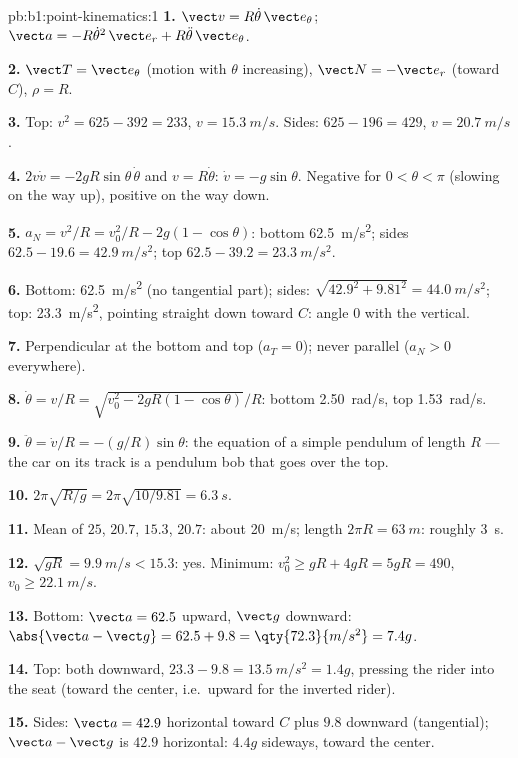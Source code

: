 \begin{solution}{pb:b1:point-kinematics:1}
\textbf{1.} $\vect v = R\dot\theta\,\vect e_\theta$; $\vect a = -R\dot\theta^2
\,\vect e_r + R\ddot\theta\,\vect e_\theta$.

\textbf{2.} $\vect T = \vect e_\theta$ (motion with $\theta$ increasing),
$\vect N = -\vect e_r$ (toward $C$), $\rho = R$.

\textbf{3.} Top: $v^2 = 625 - 392 = 233$, $v = \qty{15.3}{m/s}$. Sides:
$625 - 196 = 429$, $v = \qty{20.7}{m/s}$.

\textbf{4.} $2v\dot v = -2gR\sin\theta\,\dot\theta$ and $v = R\dot\theta$:
$\dot v = -g\sin\theta$. Negative for $0 < \theta < \pi$ (slowing on the
way up), positive on the way down.

\textbf{5.} $a_N = v^2/R = v_0^2/R - 2g(1 - \cos\theta)$: bottom
\qty{62.5}{m/s^2}; sides $62.5 - 19.6 = \qty{42.9}{m/s^2}$; top $62.5 -
39.2 = \qty{23.3}{m/s^2}$.

\textbf{6.} Bottom: \qty{62.5}{m/s^2} (no tangential part); sides:
$\sqrt{42.9^2 + 9.81^2} = \qty{44.0}{m/s^2}$; top: \qty{23.3}{m/s^2},
pointing straight down toward $C$: angle $0$ with the vertical.

\textbf{7.} Perpendicular at the bottom and top ($a_T = 0$); never
parallel ($a_N > 0$ everywhere).

\textbf{8.} $\dot\theta = v/R = \sqrt{v_0^2 - 2gR(1 - \cos\theta)}/R$:
bottom \qty{2.50}{rad/s}, top \qty{1.53}{rad/s}.

\textbf{9.} $\ddot\theta = \dot v/R = -(g/R)\sin\theta$: the equation of a
simple pendulum of length $R$ --- the car on its track is a pendulum
bob that goes over the top.

\textbf{10.} $2\pi\sqrt{R/g} = 2\pi\sqrt{10/9.81} = \qty{6.3}{s}$.

\textbf{11.} Mean of $25$, $20.7$, $15.3$, $20.7$: about \qty{20}{m/s};
length $2\pi R = \qty{63}{m}$: roughly \qty{3}{s}.

\textbf{12.} $\sqrt{gR} = \qty{9.9}{m/s} < 15.3$: yes. Minimum: $v_0^2 \geq
gR + 4gR = 5gR = 490$, $v_0 \geq \qty{22.1}{m/s}$.

\textbf{13.} Bottom: $\vect a = 62.5$ upward, $\vect g$ downward:
$\abs{\vect a - \vect g} = 62.5 + 9.8 = \qty{72.3}{m/s^2} = 7.4g$.

\textbf{14.} Top: both downward, $23.3 - 9.8 = \qty{13.5}{m/s^2} = 1.4g$,
pressing the rider into the seat (toward the center, i.e.\ upward for
the inverted rider).

\textbf{15.} Sides: $\vect a = 42.9$ horizontal toward $C$ plus $9.8$
downward (tangential); $\vect a - \vect g$ is $42.9$ horizontal: $4.4g$
sideways, toward the center.


\end{solution}
